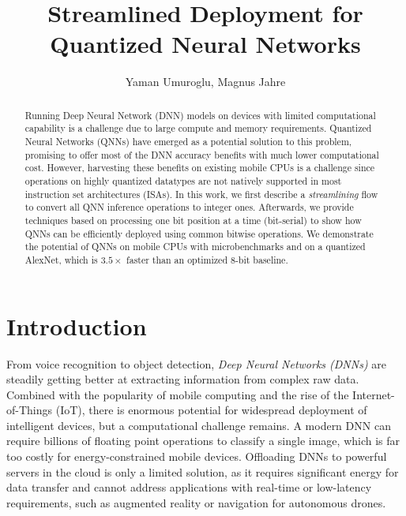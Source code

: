 \documentclass[sigconf]{acmart}
\begin{document}
\title{Streamlined Deployment for Quantized Neural Networks}


\author{Yaman Umuroglu, Magnus Jahre}

\renewcommand{\shortauthors}{Y. Umuroglu et al.}

\newcommand{\ours}{\textsc{BitSerialGEMM}}
\newcommand{\qnn}[2]{$\mathbf{W^#1A^#2}$}
\newcommand{\bitplane}[2]{$#1[#2]$}
\newcommand{\pluseq}{\mathrel{+}=}
\newcommand{\myceil}[1]{\left \lceil #1 \right \rceil }
\newcommand{\TODO}[1]{\todo[inline]{#1}}

\begin{abstract}
Running Deep Neural Network (DNN) models on devices with limited computational capability is a challenge due to large compute and memory requirements.
Quantized Neural Networks (QNNs) have emerged as a potential solution to this problem, promising to offer most of the DNN accuracy benefits with much lower computational cost.
However, harvesting these benefits on existing mobile CPUs is a challenge since operations on highly quantized datatypes are not natively supported in most instruction set architectures (ISAs).
In this work, we first describe a \emph{streamlining} flow to convert all QNN inference operations to integer ones.
Afterwards, we provide techniques based on processing one bit position at a time (bit-serial) to show how QNNs can be efficiently deployed using common bitwise operations.
We demonstrate the potential of QNNs on mobile CPUs with microbenchmarks and on a quantized AlexNet, which is $3.5\times$ faster than an optimized 8-bit baseline.
\end{abstract}

\maketitle
\setlength{\textfloatsep}{5pt}

\section{Introduction}

From voice recognition to object detection, \emph{Deep Neural Networks (DNNs)} are steadily getting better at extracting information from complex raw data.
Combined with the popularity of mobile computing and the rise of the Internet-of-Things (IoT), there is enormous potential for widespread deployment of intelligent devices, but a computational challenge remains.
A modern DNN can require billions of floating point operations to classify a single image, which is far too costly for energy-constrained mobile devices.
Offloading DNNs to powerful servers in the cloud is only a limited solution, as it requires significant energy for data transfer and cannot address applications with real-time or low-latency requirements, such as augmented reality or navigation for autonomous drones.
\end{document}
